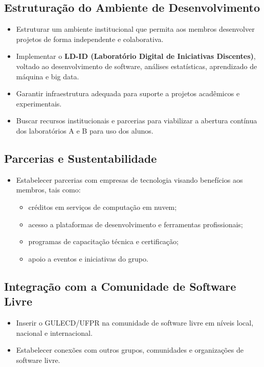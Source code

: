 \documentclass[11pt,a4paper]{article}
\begin{document}
\subsection{Estruturação do Ambiente de Desenvolvimento}

\begin{itemize}
    \item Estruturar um ambiente institucional que permita aos membros desenvolver projetos de forma independente e colaborativa.
    \item Implementar o \textbf{LD-ID (Laboratório Digital de Iniciativas Discentes)}, voltado ao desenvolvimento de software, análises estatísticas, aprendizado de máquina e big data.
    \item Garantir infraestrutura adequada para suporte a projetos acadêmicos e experimentais.
    \item Buscar recursos institucionais e parcerias para viabilizar a abertura contínua dos laboratórios A e B para uso dos alunos.
\end{itemize}


\subsection{Parcerias e Sustentabilidade}

\begin{itemize}
    \item Estabelecer parcerias com empresas de tecnologia visando benefícios aos membros, tais como:
    \begin{itemize}
        \item créditos em serviços de computação em nuvem;
        \item acesso a plataformas de desenvolvimento e ferramentas profissionais;
        \item programas de capacitação técnica e certificação;
        \item apoio a eventos e iniciativas do grupo.
    \end{itemize}
\end{itemize}

\subsection{Integração com a Comunidade de Software Livre}

\begin{itemize}
    \item Inserir o GULECD/UFPR na comunidade de software livre em níveis local, nacional e internacional.
    \item Estabelecer conexões com outros grupos, comunidades e organizações de software livre.
\end{itemize}
\end{document}
